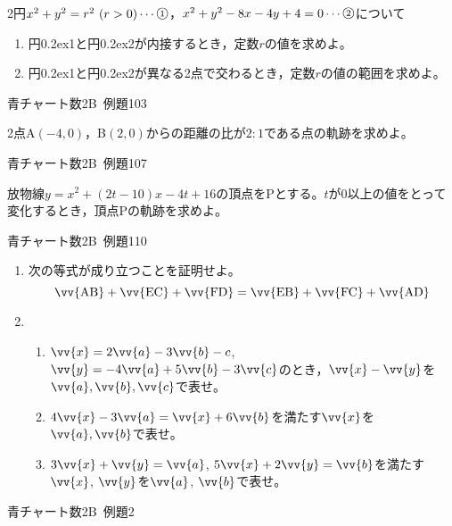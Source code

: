 \documentclass[b4paper, dvipdfmx, 11pt, fleqn, twocolumn, uplatex]{jsarticle}
\newcommand{\ctext}[1]{\raise0.2ex\hbox{\textcircled{\scriptsize{#1}}}}
\newcommand{\sv}[1]{\vv{\mathstrut#1}}
\begin{document}

\begin{screen}
2円$x^2+y^2=r^2~(r>0)\cdots\ctext{1}$，$x^2+y^2-8x-4y+4=0\cdots\ctext{2}$について
\begin{enumerate}[label={(\arabic*)}]
\item 円\ctext{1}と円\ctext{2}が内接するとき，定数$r$の値を求めよ。
\item 円\ctext{1}と円\ctext{2}が異なる2点で交わるとき，定数$r$の値の範囲を求めよ。
\end{enumerate}
\begin{flushright}
    青チャート数2B~例題103
\end{flushright}
\end{screen}


\begin{screen}
2点A$(-4, 0)$，B$(2, 0)$からの距離の比が$2:1$である点の軌跡を求めよ。
\begin{flushright}
    青チャート数2B~例題107
\end{flushright}
\end{screen}


\begin{screen}
放物線$y=x^2+(2t-10)x-4t+16$の頂点をPとする。$t$が0以上の値をとって変化するとき，頂点Pの軌跡を求めよ。
\begin{flushright}
    青チャート数2B~例題110
\end{flushright}
\end{screen}



\begin{screen}
\begin{enumerate}[label={(\arabic*)}]
\item 次の等式が成り立つことを証明せよ。
\[ \vv{\textrm{AB}}+\vv{\textrm{EC}}+\vv{\textrm{FD}}=\vv{\textrm{EB}}+\vv{\textrm{FC}}+\vv{\textrm{AD}} \]
\item %
\begin{enumerate}[label={(i)}]
\item $\sv{x}=2\sv{a}-3\sv{b}-c$, $\sv{y}=-4\sv{a}+5\sv{b}-3\sv{c}$のとき，$\sv{x}-\sv{y}$を$\sv{a}, \sv{b}, \sv{c}$で表せ。
\item $4\sv{x}-3\sv{a}=\sv{x}+6\sv{b}$を満たす$\sv{x}$を$\sv{a}, \sv{b}$で表せ。
\item $3\sv{x}+\sv{y}=\sv{a}$, $5\sv{x}+2\sv{y}=\sv{b}$を満たす$\sv{x}$, $\sv{y}$を$\sv{a}$, $\sv{b}$で表せ。
\end{enumerate}
\end{enumerate}
\begin{flushright}
    青チャート数2B~例題2
\end{flushright}
\end{screen}
\end{document}
